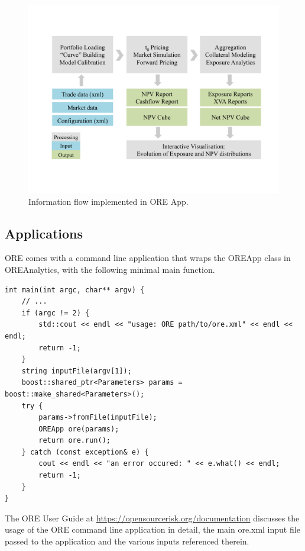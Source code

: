 \documentclass[12pt, a4paper]{article}
\begin{document}
\begin{figure}[h]
\begin{center}
\includegraphics[scale=0.6]{process.pdf}
\end{center}
\caption{ Information flow implemented in ORE App. }
\label{fig_process}
\end{figure}


\subsection*{Applications}
ORE comes with a command line application that wraps the OREApp class in OREAnalytics, with the following minimal main function.

\begin{listing}[H]
\begin{verbatim}
int main(int argc, char** argv) {
	// ...
	if (argc != 2) {
		std::cout << endl << "usage: ORE path/to/ore.xml" << endl << endl;
		return -1;
	}
	string inputFile(argv[1]);
	boost::shared_ptr<Parameters> params = boost::make_shared<Parameters>();
	try {
		params->fromFile(inputFile);
		OREApp ore(params);
		return ore.run();
	} catch (const exception& e) {
		cout << endl << "an error occured: " << e.what() << endl;
		return -1;
	}
}
\end{verbatim}
\end{listing}

The ORE User Guide at \url{https://opensourcerisk.org/documentation} discusses the usage of the ORE command line application in detail, the main ore.xml input file passed to the application and the various inputs referenced therein.
\end{document}
